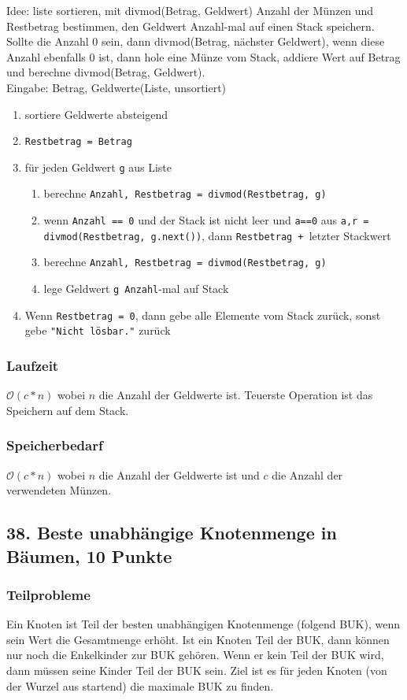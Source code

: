\documentclass[ngerman,a4paper]{report}
\begin{document}
Idee: liste sortieren, mit divmod(Betrag, Geldwert) Anzahl der Münzen und Restbetrag bestimmen, den Geldwert Anzahl-mal auf einen Stack speichern. Sollte die Anzahl 0 sein, dann divmod(Betrag, nächster Geldwert), wenn diese Anzahl ebenfalls 0 ist, dann hole eine Münze vom Stack, addiere Wert auf Betrag und berechne divmod(Betrag, Geldwert).\\
Eingabe: Betrag, Geldwerte(Liste, unsortiert)
\begin{enumerate}
\item sortiere Geldwerte absteigend
\item \lstinline!Restbetrag = Betrag!
\item für jeden Geldwert \lstinline!g! aus Liste
\begin{enumerate}
\item berechne \lstinline!Anzahl, Restbetrag = divmod(Restbetrag, g)!
\item wenn \lstinline!Anzahl == 0! und der Stack ist nicht leer und \lstinline!a==0! aus \lstinline!a,r = divmod(Restbetrag, g.next())!, dann \lstinline!Restbetrag + !letzter Stackwert
\item berechne \lstinline!Anzahl, Restbetrag = divmod(Restbetrag, g)!
\item lege Geldwert \lstinline!g Anzahl!-mal auf Stack
\end{enumerate}
\item Wenn \lstinline!Restbetrag = 0!, dann gebe alle Elemente vom Stack zurück, sonst gebe \lstinline!"Nicht lösbar."! zurück
\end{enumerate}
\subsubsection*{Laufzeit}
$\mathcal{O}(c*n)$ wobei $n$ die Anzahl der Geldwerte ist. Teuerste Operation ist das Speichern auf dem Stack.
\subsubsection{Speicherbedarf}
$\mathcal{O}(c*n)$ wobei $n$ die Anzahl der Geldwerte ist und $c$ die Anzahl der verwendeten Münzen.
\subsection*{38. Beste unabhängige Knotenmenge in Bäumen, 10 Punkte}
\subsubsection*{Teilprobleme}
Ein Knoten ist Teil der besten unabhängigen Knotenmenge (folgend BUK), wenn sein Wert die Gesamtmenge erhöht. Ist ein Knoten Teil der BUK, dann können nur noch die Enkelkinder zur BUK gehören. Wenn er kein Teil der BUK wird, dann müssen seine Kinder Teil der BUK sein. Ziel ist es für jeden Knoten (von der Wurzel aus startend) die maximale BUK zu finden.
\end{document}
